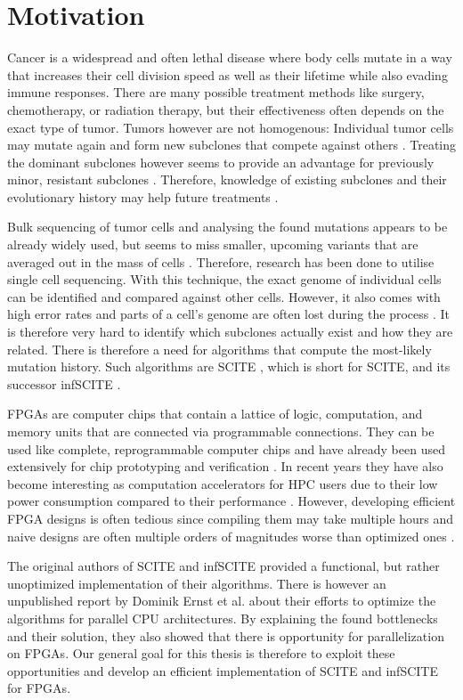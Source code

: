 \section{Motivation}

Cancer is a widespread and often lethal disease\cite{10.1001/jamaoncol.2021.6987} where body cells mutate in a way that increases their cell division speed as well as their lifetime while also evading immune responses. There are many possible treatment methods like surgery, chemotherapy, or radiation therapy, but their effectiveness often depends on the exact type of tumor. Tumors however are not homogenous: Individual tumor cells may mutate again and form new subclones that compete against others \cite{nik2012life}. Treating the dominant subclones however seems to provide an advantage for previously minor, resistant subclones \cite{gillies2012evolutionary}. Therefore, knowledge of existing subclones and their evolutionary history may help future treatments \cite{greaves2012clonal}\cite{stratton2009cancer}\cite{swanton2012intratumor}.

Bulk sequencing of tumor cells and analysing the found mutations appears to be already widely used, but seems to miss smaller, upcoming variants that are averaged out in the mass of cells \cite{navin2014cancer}. Therefore, research has been done to utilise single cell sequencing. With this technique, the exact genome of individual cells can be identified and compared against other cells. However, it also comes with high error rates and parts of a cell's genome are often lost during the process \cite{tree2016}. It is therefore very hard to identify which subclones actually exist and how they are related. There is therefore a need for algorithms that compute the most-likely mutation history. Such algorithms are \acs{SCITE} \cite{tree2016}, which is short for \acl{SCITE}, and its successor \acs{infSCITE} \cite{kuipers2017single}.

\acp{FPGA} are computer chips that contain a lattice of logic, computation, and memory units that are connected via programmable connections. They can be used like complete, reprogrammable computer chips and have already been used extensively for chip prototyping and verification \cite{rodriguez2007features}. In recent years they have also become interesting as computation accelerators for \ac{HPC} users due to their low power consumption compared to their performance \cite{betkaoui2010comparing}. However, developing efficient \ac{FPGA} designs is often tedious since compiling them may take multiple hours and naive designs are often multiple orders of magnitudes worse than optimized ones \cite{betkaoui2010comparing}.

The original authors of \ac{SCITE} and \ac{infSCITE} provided a functional, but rather unoptimized implementation of their algorithms. There is however an unpublished report by Dominik Ernst et al. \cite{ernst2020Performance} about their efforts to optimize the algorithms for parallel CPU architectures. By explaining the found bottlenecks and their solution, they also showed that there is opportunity for parallelization on \acp{FPGA}. Our general goal for this thesis is therefore to exploit these opportunities and develop an efficient implementation of \ac{SCITE} and \ac{infSCITE} for \acp{FPGA}. 